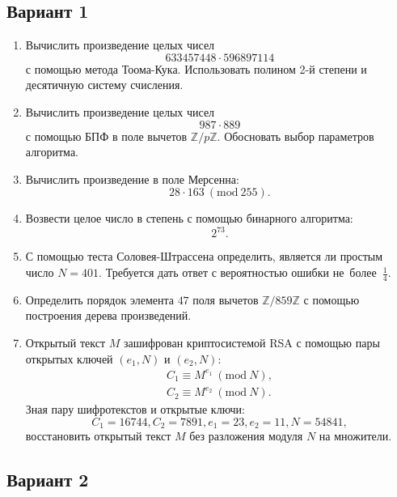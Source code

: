 \documentclass[14pt]{extarticle}
\begin{document}
	\subsection{Вариант 1}
	\begin{enumerate}
		\item Вычислить произведение целых чисел \[633457448 \cdot 596897114\] с помощью метода Тоома-Кука. Использовать полином 2-й степени и десятичную систему счисления.
		\item Вычислить произведение целых чисел \[987 \cdot 889\] с помощью БПФ в поле вычетов $\mathbb{Z}/p\mathbb{Z}$. Обосновать выбор параметров алгоритма.
		\item Вычислить произведение в поле Мерсенна: \[28 \cdot 163\ (\textrm{mod}\ 255).\]
		\item Возвести целое число в степень с помощью бинарного алгоритма: \[2^{73}.\]
		\item С помощью теста Соловея-Штрассена определить, является ли простым число $N = 401$. Требуется дать ответ с вероятностью ошибки не~более~$\frac14$.
		\item Определить порядок элемента $47$ поля вычетов $\mathbb{Z}/859\mathbb{Z}$ с помощью построения дерева произведений.
		\item Открытый текст $M$ зашифрован криптосистемой RSA с помощью пары открытых ключей $(e_1, N)$ и $(e_2, N)$:  \[\begin{aligned} C_1 \equiv M^{e_1}\ (\textrm{mod}\ N), \\ C_2 \equiv M^{e_2}\ (\textrm{mod}\ N). \end{aligned}\] Зная пару шифротекстов и открытые ключи: \[C_1 = 16744, C_2 = 7891, e_1 = 23, e_2 = 11, N = 54841,\] восстановить открытый текст $M$ без разложения модуля $N$ на множители.
	\end{enumerate}
\clearpage	\subsection{Вариант 2}
\end{document}
